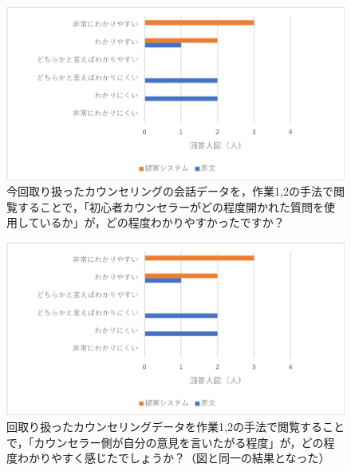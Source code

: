 \documentclass[shuuron]{kuee}
\begin{document}
\begin{figure}
  \begin{center}
    \includegraphics[width=\linewidth]{q1.png}
  \end{center}
  \caption{今回取り扱ったカウンセリングの会話データを，作業1,2の手法で閲覧することで，「初心者カウンセラーがどの程度開かれた質問を使用しているか」が，どの程度わかりやすかったですか？}
  \label{fig:q1}
\end{figure}

\begin{figure}
  \begin{center}
    \includegraphics[width=\linewidth]{q1.png}
  \end{center}
  \caption{回取り扱ったカウンセリングデータを作業1,2の手法で閲覧することで，「カウンセラー側が自分の意見を言いたがる程度」が，どの程度わかりやすく感じたでしょうか？（図\label{fig:q1}と同一の結果となった）}
  \label{fig:q1}
\end{figure}
\end{document}
